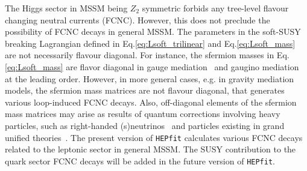\documentclass[preprint,3p,12pt]{elsarticle}
\newcommand{\HEPfit}{\texttt{HEPfit}\xspace}
\begin{document}
{%

The Higgs sector in MSSM being $Z_2$ symmetric forbids any tree-level flavour changing neutral currents (FCNC). However, this does not preclude the possibility of FCNC decays in general MSSM. The parameters in the soft-SUSY breaking Lagrangian defined in Eq.\eqref{eq:Lsoft_trilinear} and Eq.\eqref{eq:Lsoft_mass} are not necessarily flavour diagonal. For instance, the sfermion masses in Eq.\eqref{eq:Lsoft_mass} are flavor diagonal in gauge mediation~\cite{Dine:1993yw,Dine:1994vc,Dine:1995ag} and gaugino mediation~\cite{Inoue:1991rk,Kaplan:1999ac,Chacko:1999mi} at the leading order. However, in more general cases, e.g. in gravity mediation models, the sfermion mass matrices are not flavour diagonal, that generates various loop-induced FCNC decays. Also, off-diagonal elements of the sfermion mass matrices may arise as results of quantum corrections involving heavy particles, such as right-handed (s)neutrinos~\cite{Borzumati:1986qx, Hisano:1995nq, Hisano:1995cp} and  particles existing in grand unified theories~\cite{Barbieri:1995tw, Moroi:2000mr, Barenboim:2000ev,  Moroi:2000tk}. The present version of \HEPfit calculates various FCNC decays related to the leptonic sector in general MSSM. The SUSY contribution to the quark sector FCNC decays will be added in the future version of \HEPfit.

}
\end{document}
